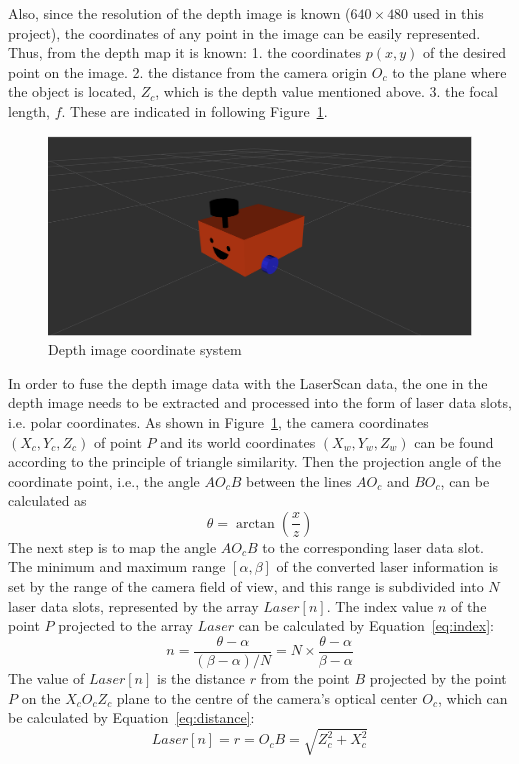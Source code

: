 Also, since the resolution of the depth image is known ($640\times480$ used in this project), the coordinates of any point in the image can be easily represented.
Thus, from the depth map it is known: 
1. the coordinates $p(x, y)$ of the desired point on the image. 
2. the distance from the camera origin $O_c$ to the plane where the object is located, $Z_c$, which is the depth value mentioned above. 
3. the focal length, $f$. These are indicated in following Figure~\ref{fig:depth_coordinate}.
\begin{figure}[H]
    \centering
    \includegraphics[width=0.8\linewidth]{figs/robot.png}
    \caption{Depth image coordinate system}
    \label{fig:depth_coordinate}
\end{figure}
In order to fuse the depth image data with the LaserScan data, 
the one in the depth image needs to be extracted and processed into the form of laser data slots, i.e. polar coordinates. 
As shown in Figure~\ref{fig:depth_coordinate}, the camera coordinates $(X_c, Y_c, Z_c)$ of point $P$ and its world coordinates $(X_w, Y_w, Z_w)$ 
can be found according to the principle of triangle similarity. 
Then the projection angle of the coordinate point, i.e., the angle $AO_cB$ between the lines $AO_c$ and $BO_c$, can be calculated as 
\begin{equation}
    \theta=\arctan{(\frac{x}{z})}
\end{equation}
The next step is to map the angle $AO_cB$ to the corresponding laser data slot. 
The minimum and maximum range $[\alpha, \beta]$ of the converted laser information is set by the range of the camera field of view, 
and this range is subdivided into $N$ laser data slots, represented by the array $Laser[n]$. 
The index value $n$ of the point $P$ projected to the array $Laser$ can be calculated by Equation~\ref{eq:index}:
\begin{equation}
    n=\frac{\theta-\alpha}{(\beta-\alpha)/N}=N\times\frac{\theta-\alpha}{\beta-\alpha}
    \label{eq:index}
\end{equation}
The value of $Laser[n]$ is the distance $r$ from the point $B$ projected 
by the point $P$ on the $X_cO_cZ_c$ plane to the centre of the camera's optical center $O_c$, 
which can be calculated by Equation~\ref{eq:distance}:
\begin{equation}
    Laser[n]=r=O_cB=\sqrt{Z_c^2+X_c^2}
    \label{eq:distance}
\end{equation}


